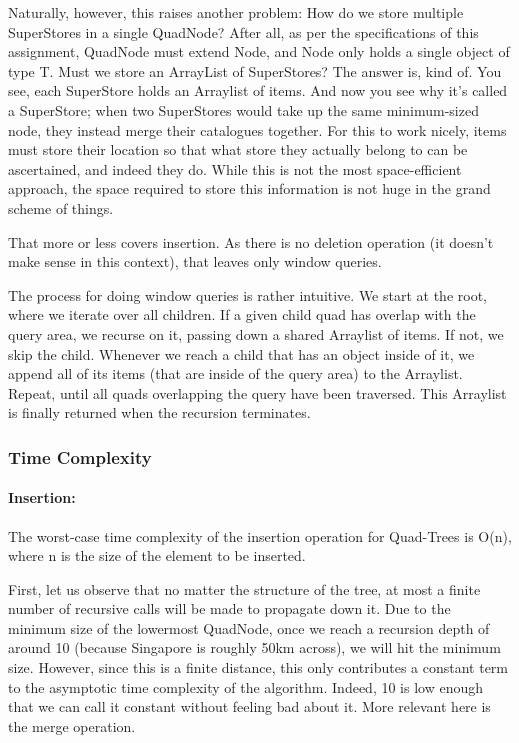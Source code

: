 \documentclass[12pt]{article}
\begin{document}
{Naturally, however, this raises another problem: How do we store multiple SuperStores in a single QuadNode? After all, as per the specifications of this assignment, QuadNode must extend Node, and Node only holds a single object of type T. Must we store an ArrayList of SuperStores? The answer is, kind of. You see, each SuperStore holds an Arraylist of items. And now you see why it's called a SuperStore; when two SuperStores would take up the same minimum-sized node, they instead merge their catalogues together. For this to work nicely, items must store their location so that what store they actually belong to can be ascertained, and indeed they do. While this is not the most space-efficient approach, the space required to store this information is not huge in the grand scheme of things.

That more or less covers insertion. As there is no deletion operation (it doesn't make sense in this context), that leaves only window queries.

The process for doing window queries is rather intuitive. We start at the root, where we iterate over all children. If a given child quad has overlap with the query area, we recurse on it, passing down a shared Arraylist of items. If not, we skip the child. Whenever we reach a child that has an object inside of it, we append all of its items (that are inside of the query area) to the Arraylist. Repeat, until all quads overlapping the query have been traversed. This Arraylist is finally returned when the recursion terminates.

\subsubsection{Time Complexity}

\paragraph{Insertion:} 

The worst-case time complexity of the insertion operation for Quad-Trees is O(n), where n is the size of the element to be inserted.

First, let us observe that no matter the structure of the tree, at most a finite number of recursive calls will be made to propagate down it. Due to the minimum size of the lowermost QuadNode, once we reach a recursion depth of around 10 (because Singapore is roughly 50km across), we will hit the minimum size. However, since this is a finite distance, this only contributes a constant term to the asymptotic time complexity of the algorithm. Indeed, 10 is low enough that we can call it constant without feeling bad about it. More relevant here is the merge operation.

}
\end{document}
